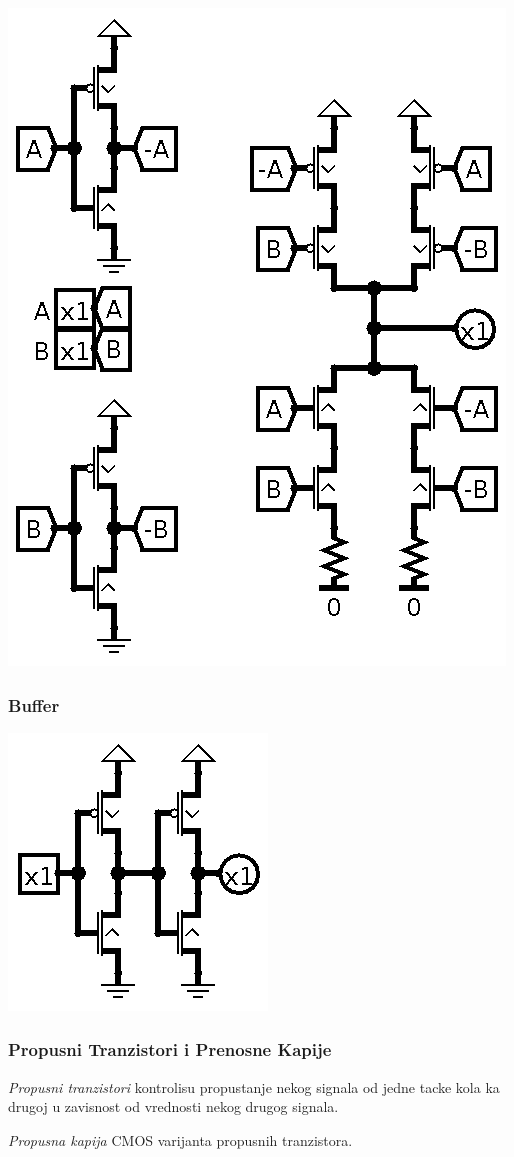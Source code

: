 \documentclass[12p,a4paper]{article}
\begin{document}
\begin{multicols}{2}
    \includegraphics[width=0.7\columnwidth]{Figures/mos_xor.png}

    \subsubsection{Buffer}

    \includegraphics[width=0.4\columnwidth]{Figures/mos_buffer.png}

    \subsubsection{Propusni Tranzistori i Prenosne Kapije}

    \emph{Propusni tranzistori} kontrolisu propustanje nekog signala od jedne 
    tacke kola ka drugoj u zavisnost od vrednosti nekog drugog signala.

    \emph{Propusna kapija} CMOS varijanta propusnih tranzistora.


\end{multicols}
\end{document}

